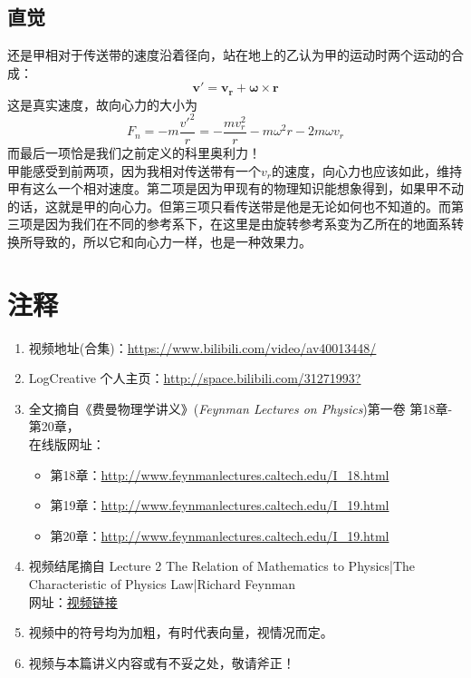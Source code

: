 \section{直觉}
还是甲相对于传送带的速度沿着径向，站在地上的乙认为甲的运动时两个运动的合成：
\begin{equation}
  \bm{v'}=\bm{v_r}+\bm{\omega}\times \bm{r}
\end{equation}
这是真实速度，故向心力的大小为
\begin{equation}
  F_n=-m\frac{v'^2}{r}=-\frac{mv_r^2}{r}-m\omega^2 r-2m\omega v_r
\end{equation}
而最后一项恰是我们之前定义的科里奥利力！\\
甲能感受到前两项，因为我相对传送带有一个$v_r$的速度，向心力也应该如此，维持甲有这么一个相对速度。第二项是因为甲现有的物理知识能想象得到，如果甲不动的话，这就是甲的向心力。但第三项只看传送带是他是无论如何也不知道的。而第三项是因为我们在不同的参考系下，在这里是由旋转参考系变为乙所在的地面系转换所导致的，所以它和向心力一样，也是一种效果力。
\appendix
\chapter{注释}
\begin{enumerate}
  \item 视频地址(合集)：\url{https://www.bilibili.com/video/av40013448/}
  \item LogCreative 个人主页：\url{http://space.bilibili.com/31271993?}
  \item 全文摘自《费曼物理学讲义》(\textit{Feynman Lectures on Physics})第一卷 第18章-第20章，\\在线版网址：
  \begin{itemize}
    \item 第18章：\url{http://www.feynmanlectures.caltech.edu/I_18.html}
    \item 第19章：\url{http://www.feynmanlectures.caltech.edu/I_19.html}
    \item 第20章：\url{http://www.feynmanlectures.caltech.edu/I_19.html}
  \end{itemize}
  \item 视频结尾摘自 Lecture 2 The Relation of Mathematics to Physics|The Characteristic of Physics Law|Richard Feynman\\
  网址：\href{http://www.cornell.edu/video/richard-feynman-messenger-
  lecture-2-relation-mathematics-physics}{视频链接}
  \item 视频中的符号均为加粗，有时代表向量，视情况而定。
  \item 视频与本篇讲义内容或有不妥之处，敬请斧正！
\end{enumerate}
